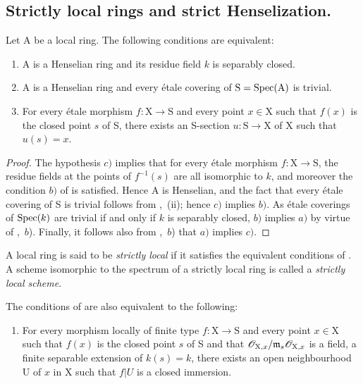 \subsection{Strictly local rings and strict Henselization.}
\label{subsection:IV.18.8}

\begin{proposition}[18.8.1]
\label{IV.18.8.1}
Let $\mathrm{A}$ be a local ring.
The following conditions are equivalent:
\begin{enumerate}[label=\emph{\alph*)}]
  \item A is a Henselian ring and its residue field $k$ is separably closed.
  \item A is a Henselian ring and every \'{e}tale covering of $\mathrm{S}=\operatorname{Spec}(\mathrm{A})$ is trivial.
  \item For every \'{e}tale morphism $f:\mathrm{X}\to\mathrm{S}$ and every point $x\in\mathrm{X}$ such that $f(x)$ is the closed point $s$ of S, there exists an S-section $u:\mathrm{S}\to\mathrm{X}$ of X such that $u(s)=x$.
\end{enumerate}
\end{proposition}

\begin{proof}
The hypothesis $c)$ implies that for every \'{e}tale morphism $f:\mathrm{X}\to\mathrm{S}$, the residue fields at the points of $f^{-1}(s)$ are all isomorphic to $k$, and moreover the condition $b)$ of  is satisfied.
Hence A is Henselian, and the fact that every \'{e}tale covering of S is trivial follows from ,~(ii);
hence $c)$ implies $b)$.
As \'{e}tale coverings of $\operatorname{Spec}(k)$ are trivial if and only if $k$ is separably closed, $b)$ implies $a)$ by virtue of ,~$b$).
Finally, it follows also from ,~$b$) that $a)$ implies $c)$.
\end{proof}

\begin{definition}[18.8.2]
\label{IV.18.8.2}
A local ring is said to be \emph{strictly local} if it satisfies the equivalent conditions of .
A scheme isomorphic to the spectrum of a strictly local ring is called a \emph{strictly local scheme}.
\end{definition}

\begin{remark}[18.8.3]
\label{IV.18.8.3}
The conditions of  are also equivalent to the following:
\begin{enumerate}
  \item[d)] For every morphism locally of finite type $f:\mathrm{X}\to\mathrm{S}$ and every point $x\in\mathrm{X}$ such that $f(x)$ is the closed point $s$ of S and that $\mathscr{O}_{\mathrm{X},x}/\mathfrak{m}_s\mathscr{O}_{\mathrm{X},x}$ is a field, a finite separable extension of $k(s)=k$, there exists an open neighbourhood U of $x$ in X such that $f|U$ is a closed immersion.
\end{enumerate}
\end{remark}

